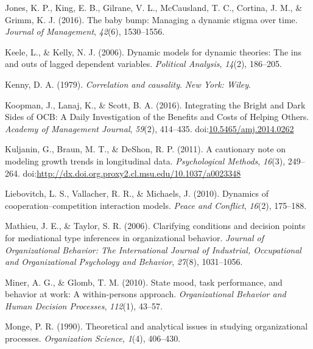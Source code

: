 \documentclass[english,,man]{apa6}
\theoremstyle{definition}
\theoremstyle{definition}
\theoremstyle{definition}
\theoremstyle{remark}
\begin{document}
\leavevmode\hypertarget{ref-jones_baby_2016}{}%
Jones, K. P., King, E. B., Gilrane, V. L., McCausland, T. C., Cortina,
J. M., \& Grimm, K. J. (2016). The baby bump: Managing a dynamic stigma
over time. \emph{Journal of Management}, \emph{42}(6), 1530--1556.

\leavevmode\hypertarget{ref-keele_dynamic_2006}{}%
Keele, L., \& Kelly, N. J. (2006). Dynamic models for dynamic theories:
The ins and outs of lagged dependent variables. \emph{Political
Analysis}, \emph{14}(2), 186--205.

\leavevmode\hypertarget{ref-kenny1979correlation}{}%
Kenny, D. A. (1979). \emph{Correlation and causality}. \emph{New York:
Wiley}.

\leavevmode\hypertarget{ref-koopman_integrating_2016}{}%
Koopman, J., Lanaj, K., \& Scott, B. A. (2016). Integrating the Bright
and Dark Sides of OCB: A Daily Investigation of the Benefits and Costs
of Helping Others. \emph{Academy of Management Journal}, \emph{59}(2),
414--435.
doi:\href{https://doi.org/10.5465/amj.2014.0262}{10.5465/amj.2014.0262}

\leavevmode\hypertarget{ref-kuljanin_cautionary_2011}{}%
Kuljanin, G., Braun, M. T., \& DeShon, R. P. (2011). A cautionary note
on modeling growth trends in longitudinal data. \emph{Psychological
Methods}, \emph{16}(3), 249--264.
doi:\href{https://doi.org/http://dx.doi.org.proxy2.cl.msu.edu/10.1037/a0023348}{http://dx.doi.org.proxy2.cl.msu.edu/10.1037/a0023348}

\leavevmode\hypertarget{ref-liebovitch2010dynamics}{}%
Liebovitch, L. S., Vallacher, R. R., \& Michaels, J. (2010). Dynamics of
cooperation--competition interaction models. \emph{Peace and Conflict},
\emph{16}(2), 175--188.

\leavevmode\hypertarget{ref-mathieu2006clarifying}{}%
Mathieu, J. E., \& Taylor, S. R. (2006). Clarifying conditions and
decision points for mediational type inferences in organizational
behavior. \emph{Journal of Organizational Behavior: The International
Journal of Industrial, Occupational and Organizational Psychology and
Behavior}, \emph{27}(8), 1031--1056.

\leavevmode\hypertarget{ref-miner2010state}{}%
Miner, A. G., \& Glomb, T. M. (2010). State mood, task performance, and
behavior at work: A within-persons approach. \emph{Organizational
Behavior and Human Decision Processes}, \emph{112}(1), 43--57.

\leavevmode\hypertarget{ref-monge_theoretical_1990}{}%
Monge, P. R. (1990). Theoretical and analytical issues in studying
organizational processes. \emph{Organization Science}, \emph{1}(4),
406--430.
\end{document}
